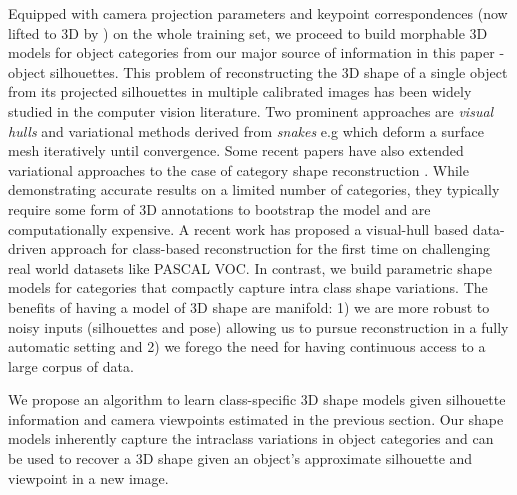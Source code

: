 \label{densemodels}
Equipped with camera projection parameters and keypoint correspondences (now lifted to 3D by \nrsfm) on the whole training set, we proceed to build morphable 3D models for object categories from our major source of information in this paper - object silhouettes. This problem of reconstructing the 3D shape of a single object from its projected silhouettes in multiple calibrated images has been widely studied in the computer vision literature. Two prominent approaches are \textit{visual hulls} \cite{laurentini1994hull} and variational methods derived from \textit{snakes} e.g \cite{esteban2004snake,yusuf2006snake} which deform a surface mesh iteratively until convergence. Some recent papers have also extended variational approaches to the case of category shape reconstruction \cite{cashman2013dolphins,chen20123d}. While demonstrating accurate results on a limited number of categories, they typically require some form of 3D annotations to bootstrap the model and are computationally expensive. A recent work \cite{carvi14} has proposed a visual-hull based data-driven approach for class-based reconstruction for the first time on challenging real world datasets like PASCAL VOC. In contrast, we build parametric shape models for categories that compactly capture intra class shape variations. The benefits of having a model of 3D shape are manifold: 1) we are more robust to noisy inputs (silhouettes and pose) allowing us to pursue reconstruction in a fully automatic setting and 2) we forego the need for having continuous access to a large corpus of data. 

We propose an algorithm to learn class-specific 3D shape models given silhouette information and camera viewpoints estimated in the previous section. Our shape models inherently capture the intraclass variations in object categories and can be used to recover a 3D shape given an object's approximate silhouette and viewpoint in a new image.
